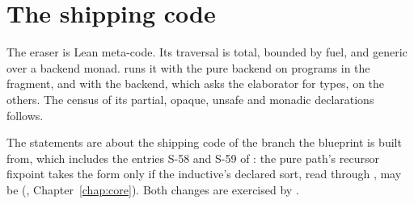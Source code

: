 

\section{The shipping code}\label{sec:trust-shipping}

The eraser is Lean meta-code. Its traversal is total, bounded by fuel, and generic over a backend
monad.  runs it with the pure backend on programs in the fragment, and with the
 backend, which asks the elaborator for types, on the others. The census of its
partial, opaque, unsafe and monadic declarations follows.

The statements are about the shipping code of the branch the blueprint is built from, which includes the entries S-58 and S-59 of : the pure path's recursor fixpoint takes the  form only if the inductive's declared sort, read through , may be  (, Chapter~\ref{chap:core}). Both changes are exercised by .


